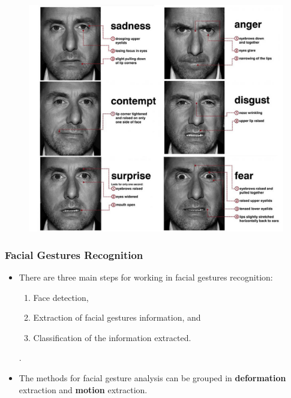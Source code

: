 \documentclass[compress]{beamer}
\begin{document}
\begin{frame}
		\begin{figure}
		\centering
		\includegraphics[scale=0.3]{img/microexpressions2.jpg}
	\end{figure}
\end{frame}

\begin{frame}
	\frametitle{Facial Gestures Recognition}
	\begin{itemize}
	\item There are three main steps for working in facial gestures recognition:
		\begin{enumerate}
		\item Face detection,
		\item Extraction of facial gestures information, and
		\item Classification of the information extracted.
		\end{enumerate}.
	\item The methods for facial gesture analysis can be grouped in \textbf{deformation} extraction and \textbf{motion} extraction.
	\end{itemize}
\end{frame}
\end{document}
